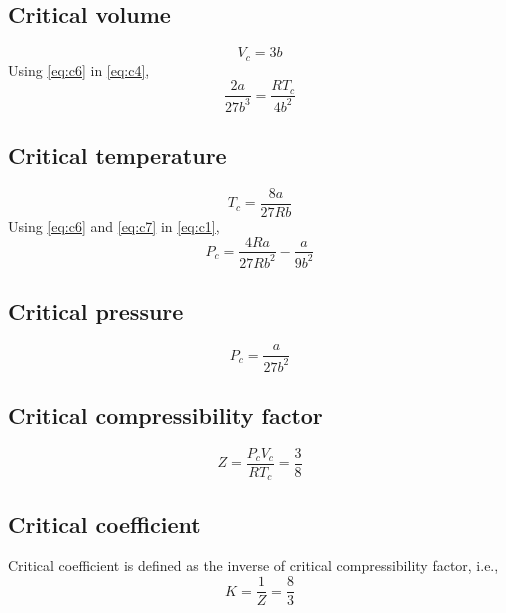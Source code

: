 \documentclass{article}
\numberwithin{equation}{section}
\begin{document}
\subsection{Critical volume}
\begin{equation}
  \boxed{V_c = 3b} \label{eq:c6}
\end{equation}
Using \eqref{eq:c6} in \eqref{eq:c4},
$$\frac{2a}{27b^3} = \frac{RT_c}{4b^2}$$
\subsection{Critical temperature}
\begin{equation}
  \boxed{T_c = \frac{8a}{27Rb}} \label{eq:c7}
\end{equation}
Using \eqref{eq:c6} and \eqref{eq:c7} in \eqref{eq:c1},
$$P_c = \frac{4Ra}{27Rb^2} - \frac{a}{9b^2}$$
\subsection{Critical pressure}
\begin{equation}
  \boxed{P_c = \frac{a}{27b^2}} \label{eq:c8}
\end{equation}
\subsection{Critical compressibility factor}
$$Z = \frac{P_c V_c}{R T_c} = \frac{3}{8}$$
\subsection{Critical coefficient}
Critical coefficient is defined as the inverse of critical compressibility factor, i.e.,
$$K = \frac{1}{Z} = \frac{8}{3}$$
\end{document}
